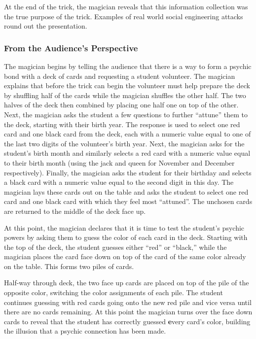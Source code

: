 At the end of the trick, the magician reveals that this information
collection was the true purpose of the trick.
Examples of real world social engineering attacks round out the
presentation.

\subsubsection{From the Audience's Perspective}

The magician begins by
telling the audience that there
is a way to form a psychic bond with a deck of cards
and requesting a student volunteer.
The magician explains that before the trick can begin the volunteer must
help prepare the deck by shuffling half of the cards while the magician
shuffles the other half.
The two halves of the deck then combined by placing one half
one on top of the other.
Next, the magician asks the student
a few questions to further ``attune'' them to the deck,
starting with their birth year.
The response
is used to select one red card and one black card from the deck,
each with a numeric value equal to one of the last two digits of
the volunteer's birth year.
Next, the magician asks for the student's birth month and similarly selects
a red card with a numeric value equal
to their birth month (using the jack and queen for November and December
respectively).
Finally, the magician asks the student
for their birthday and selects a black card with a numeric value
equal to the second digit in this day.
The magician lays these cards out on the table and asks the student to select
one red card and one black card with which they feel most ``attuned''.
The unchosen cards are returned to the middle
of the deck face up.

At this point, the magician declares
that it is time to test the student's psychic powers by asking them to
guess the color of each card in the deck.  Starting with the top of the deck,
the student guesses either ``red'' or ``black,''  while the magician
places the card face down on top of the card of the same
color already on the table.
This forms two piles of cards.

Half-way through deck,
the two face up cards are placed on top of the
pile of the opposite color, switching the color assignments of
each pile.
The student continues guessing
with red cards going onto the new red pile and vice versa
until
there are no cards remaining.
At this point the magician turns over the face
down cards to reveal that the student has correctly guessed {\textbf every}
card's color, building the illusion that a psychic connection has been made.

